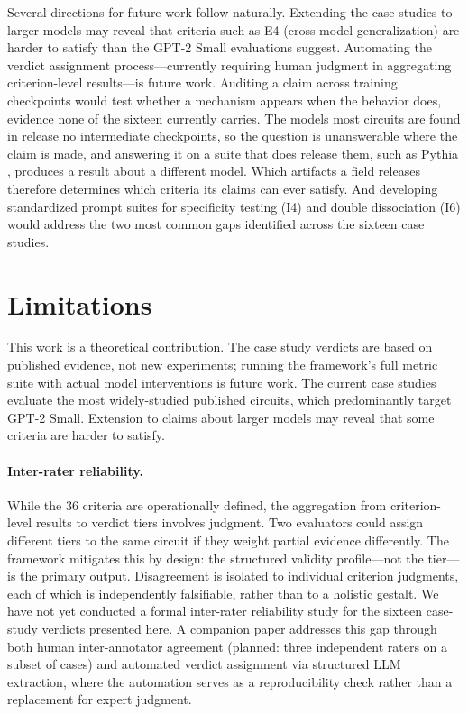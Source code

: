 \documentclass{article}
\begin{document}
Several directions for future work follow naturally. Extending the case studies to larger models may reveal that criteria such as E4 (cross-model generalization) are harder to satisfy than the GPT-2 Small evaluations suggest. Automating the verdict assignment process---currently requiring human judgment in aggregating criterion-level results---is future work. Auditing a claim across training checkpoints would test whether a mechanism appears when the behavior does, evidence none of the sixteen currently carries. The models most circuits are found in release no intermediate checkpoints, so the question is unanswerable where the claim is made, and answering it on a suite that does release them, such as Pythia \citep{biderman2023pythia}, produces a result about a different model. Which artifacts a field releases therefore determines which criteria its claims can ever satisfy. And developing standardized prompt suites for specificity testing (I4) and double dissociation (I6) would address the two most common gaps identified across the sixteen case studies.

\section{Limitations}
\label{sec:limitations}

This work is a theoretical contribution. The case study verdicts are based on published evidence, not new experiments; running the framework's full metric suite with actual model interventions is future work. The current case studies evaluate the most widely-studied published circuits, which predominantly target GPT-2 Small. Extension to claims about larger models may reveal that some criteria are harder to satisfy.

\paragraph{Inter-rater reliability.} While the 36 criteria are operationally defined, the aggregation from criterion-level results to verdict tiers involves judgment. Two evaluators could assign different tiers to the same circuit if they weight partial evidence differently. The framework mitigates this by design: the structured validity profile---not the tier---is the primary output. Disagreement is isolated to individual criterion judgments, each of which is independently falsifiable, rather than to a holistic gestalt. We have not yet conducted a formal inter-rater reliability study for the sixteen case-study verdicts presented here. A companion paper addresses this gap through both human inter-annotator agreement (planned: three independent raters on a subset of cases) and automated verdict assignment via structured LLM extraction, where the automation serves as a reproducibility check rather than a replacement for expert judgment.
\end{document}
